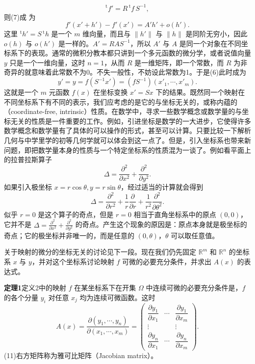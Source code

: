 \[
 {}^{\mathrm t}f'=R\,{}^{\mathrm t}f\,S^{-1},
\]
则(7)成 为
\[
 f'(x'+h')-f'(x')=A'h'+o(h').
\]
这里 ${}^{\mathrm t}h'=S\,{}^{\mathrm t}h$ 是一个 $m$ 维向量，而且与 $\lVert h'\rVert$ 与 $\lVert h\rVert$ 是同阶无穷小，因此 $o(h)$ 与 $o(h')$ 是一样的。$A'=RAS^{-1}$，所以 $A'$ 与 $A$ 是同一个对象在不同坐标系下的表现。通常的微积分教本都只讲到一个多元函数的微分学，或者说值向量 $y$ 只是一个一维向量，这时 $n=1$，从而 $R$ 是一维矩阵，即一个常数，而 $R$ 为非奇异的就意味着此常数不为0。不失一般性，不妨设此常数为1。于是(6)此时成为
\[
 y'=y=f(S^{-1}x')=(fS^{-1})(x'_1,\cdots,x'_m).
\]
这就是一个 $m$ 元函数 $f(x)$ 在坐标变换 $x'=Sx$ 下的结果。既然同一个映射在不同坐标系下有不同的表示，我们应考虑的是它的与坐标无关的，或称内蕴的（coordinate-free, intrinsic）性质。在数学中，寻求一些数学概念或数学量的与坐标无关的性质是一件重要的工作。例如，引进坐标是数学的一大进步，它使得许多数学概念和数学量有了具体的可以操作的形式，甚至可以计算。只要比较一下解析几何与中学里学的初等几何学就可以体会到这一点了。但是，引入坐标系也带来新问题，即把数学量本身的性质与一个特定坐标系的性质混为一谈了。例如看平面上的拉普拉斯算子
\[
 \Delta=\frac{\partial^2}{\partial x^2}+\frac{\partial^2}{\partial y^2}.
\]
如果引入极坐标 $x=r\cos\theta,y=r\sin\theta$，经过适当的计算就会得到
\[
 \Delta=\frac{\partial^2}{\partial r^2}+\frac1r\frac{\partial}{\partial r}+\frac1{r^2}\frac{\partial^2}{\partial\theta^2}.
\]
似乎 $r=0$ 是这个算子的奇点，但是 $r=0$ 相当于直角坐标系中的原点 $(0,0)$，它并不是 $\Delta=\frac{\partial^2}{\partial x^2}+\frac{\partial^2}{\partial y^2}$ 的奇点。产生这个现象的原因是：原点本身就是极坐标的奇点；它的极坐标并非唯一的，而是任意的 $(0,\theta)$，$\theta$ 可以取任意值。

关于映射的微分的坐标无关的讨论见下一段。现在我们仍先固定 $\mathbb R^m$ 和 $\mathbb R^n$ 的坐标系 $x$ 与 $y$，并对这个坐标系讨论映射 $f$ 可微的必要充分条件，并求出 $A(x)$ 的表达式。

\noindent\textbf{定理1}\quad 定义2中的映射 $f$ 在某坐标系下在开集 $\Omega$ 中连续可微的必要充分条件是，$f$ 的各个分量 $y_i$ 对任意 $x_j$ 均为连续可微函数。这时
\begin{equation}
 A(x)=\frac{\partial(y_1,\cdots,y_n)}{\partial(x_1,\cdots,x_m)}=
 \begin{pmatrix}
 \dfrac{\partial y_1}{\partial x_1}&\cdots&\dfrac{\partial y_1}{\partial x_m}\\
 \vdots&&\vdots\\
 \dfrac{\partial y_n}{\partial x_1}&\cdots&\dfrac{\partial y_n}{\partial x_m}
 \end{pmatrix}.
 \tag{11}
\end{equation}
(11)右方矩阵称为雅可比矩阵（Jacobian matrix）。

